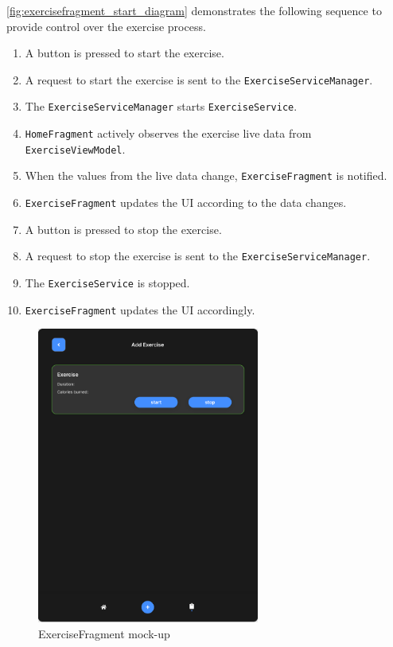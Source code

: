 \autoref{fig:exercisefragment_start_diagram} demonstrates the following sequence to provide control over the exercise process.
\begin{enumerate}
    \item A button is pressed to start the exercise.
    \item A request to start the exercise is sent to the \texttt{ExerciseServiceManager}.
    \item The \texttt{ExerciseServiceManager} starts \texttt{ExerciseService}.
    \item \texttt{HomeFragment} actively observes the exercise live data from \texttt{ExerciseViewModel}.
    \item When the values from the live data change, \texttt{ExerciseFragment} is notified.
    \item \texttt{ExerciseFragment} updates the UI according to the data changes.
    \item A button is pressed to stop the exercise.
    \item A request to stop the exercise is sent to the \texttt{ExerciseServiceManager}.
    \item The \texttt{ExerciseService} is stopped.
    \item \texttt{ExerciseFragment} updates the UI accordingly.
\end{enumerate}

\begin{figure}[H]
    \centering
    \includegraphics[width=0.65\textwidth]{images/exercise-fragment-mockup.png}
    \caption{ExerciseFragment mock-up}
    \label{fig:exercisefragment_mockup}
\end{figure}

